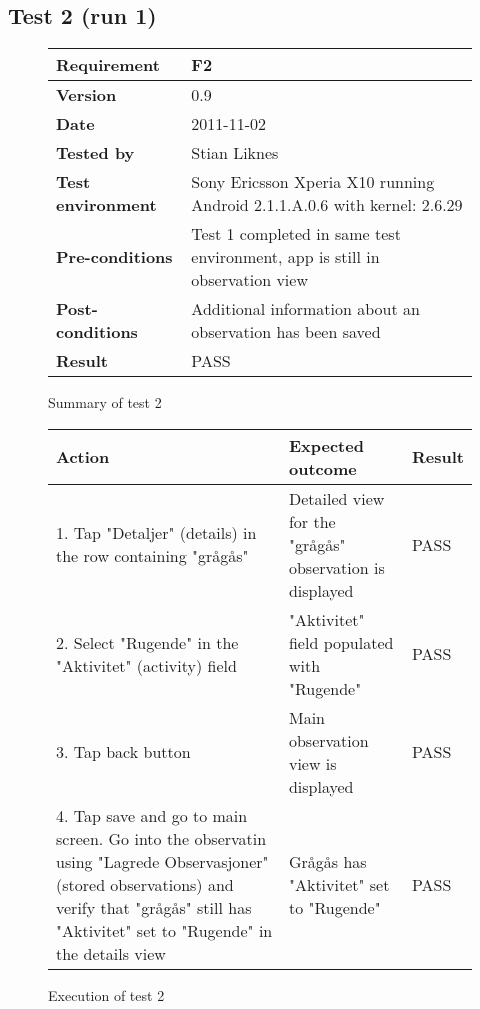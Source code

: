 \newpage
\subsection*{Test 2 (run 1)}

	\begin{figure}[htb]
		\centering
		\begin{tabular}{|p{3.5cm}|p{7.0cm}|} \hline
			\textbf{Requirement} & F2 \\ \hline
			\textbf{Version} & 0.9 \\ \hline
			\textbf{Date} & 2011-11-02 \\ \hline
			\textbf{Tested by} & Stian Liknes \\ \hline
			\textbf{Test environment} & Sony Ericsson Xperia X10 running Android 2.1.1.A.0.6 with kernel: 2.6.29 \\ \hline
			\textbf{Pre-conditions} & Test 1 completed in same test environment, app is still in observation view \\ \hline
			\textbf{Post-conditions} & Additional information about an observation has been saved \\ \hline
			\textbf{Result} & PASS \\ \hline
		\end{tabular}
		\caption{Summary of test 2}
	\end{figure}

	\begin{figure}[htb]
		\centering

		\begin{tabular}{|p{5.0cm}|p{5.0cm}|p{1cm}|}
			\hline \textbf{Action} & \textbf{Expected outcome} & \textbf{Result} \\ \hline

			1. Tap "Detaljer" (details) in the row containing "grågås" &
			Detailed view for the "grågås" observation is displayed & 
			PASS \\ \hline

			2. Select "Rugende" in the "Aktivitet" (activity) field &
			"Aktivitet" field populated with "Rugende" &
			PASS \\ \hline

			3. Tap back button & 
			Main observation view is displayed & 
			PASS \\ \hline

			4. Tap save and go to main screen. Go into the observatin using
			"Lagrede Observasjoner" (stored observations) and verify that "grågås"
			still has "Aktivitet" set to "Rugende" in the details view &
			Grågås has "Aktivitet" set to "Rugende" &
			PASS \\ \hline
		\end{tabular}
		\caption{Execution of test 2}
	\end{figure}

